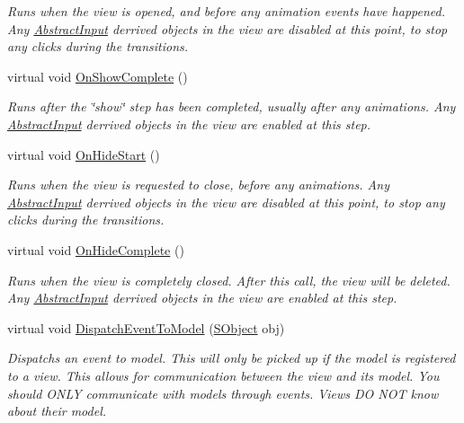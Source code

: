 \begin{DoxyCompactItemize}
\begin{DoxyCompactList}\small\item\em Runs when the view is opened, and before any animation events have happened. Any \hyperlink{class_scaffolding_1_1_abstract_input}{Abstract\+Input} derrived objects in the view are disabled at this point, to stop any clicks during the transitions. \end{DoxyCompactList}\item 
virtual void \hyperlink{class_scaffolding_1_1_abstract_view_ad3d0ee8b69a70afa3355c9aad0ab34b6}{On\+Show\+Complete} ()
\begin{DoxyCompactList}\small\item\em Runs after the \char`\"{}show\char`\"{} step has been completed, usually after any animations. Any \hyperlink{class_scaffolding_1_1_abstract_input}{Abstract\+Input} derrived objects in the view are enabled at this step. \end{DoxyCompactList}\item 
virtual void \hyperlink{class_scaffolding_1_1_abstract_view_ae8e198103d966b4a12bc8fdb27296765}{On\+Hide\+Start} ()
\begin{DoxyCompactList}\small\item\em Runs when the view is requested to close, before any animations. Any \hyperlink{class_scaffolding_1_1_abstract_input}{Abstract\+Input} derrived objects in the view are disabled at this point, to stop any clicks during the transitions. \end{DoxyCompactList}\item 
virtual void \hyperlink{class_scaffolding_1_1_abstract_view_aa5b29ad6a0a57677261e0bdc3b2e9825}{On\+Hide\+Complete} ()
\begin{DoxyCompactList}\small\item\em Runs when the view is completely closed. After this call, the view will be deleted. Any \hyperlink{class_scaffolding_1_1_abstract_input}{Abstract\+Input} derrived objects in the view are enabled at this step. \end{DoxyCompactList}\item 
virtual void \hyperlink{class_scaffolding_1_1_abstract_view_a4c2e1951ff7342457f17e19d172aa8c0}{Dispatch\+Event\+To\+Model} (\hyperlink{class_scaffolding_1_1_s_object}{S\+Object} obj)
\begin{DoxyCompactList}\small\item\em Dispatchs an event to model. This will only be picked up if the model is registered to a view. This allows for communication between the view and its model. You should O\+N\+L\+Y communicate with models through events. Views D\+O N\+O\+T know about their model. \end{DoxyCompactList}\item 

\end{DoxyCompactItemize}
